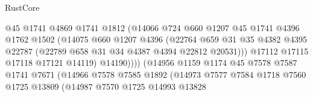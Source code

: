 \begin{lexlean}{RustCore}
\begin{coremodule}
                                        @45
                                        @1741
                                        @4869
                                        @1741
                                        @1812
                                        (@14066
                                          @724
                                          @660
                                          @1207
                                          @45
                                          @1741
                                          @4396
                                          @1762
                                          @1502
                                          (@14075
                                            @660
                                            @1207
                                            @4396
                                            (@22764
                                              @659
                                              @31
                                              @35
                                              @4382
                                              @4395
                                              @22787
                                              (@22789 @658 @31 @34 @4387 @4394 @22812 @20531)))
                                          @17112
                                          @17115
                                          @17118
                                          @17121
                                          @14119)
                                        @14190))))
                                (@14956
                                  @1159
                                  @1174
                                  @45
                                  @7578
                                  @7587
                                  @1741
                                  @7671
                                  (@14966
                                    @7578
                                    @7585
                                    @1892
                                    (@14973
                                      @7577
                                      @7584
                                      @1718
                                      @7560
                                      @1725
                                      @13809
                                      (@14987
                                        @7570
                                        @1725
                                        @14993
                                        @13828

\end{coremodule}
\end{lexlean}
